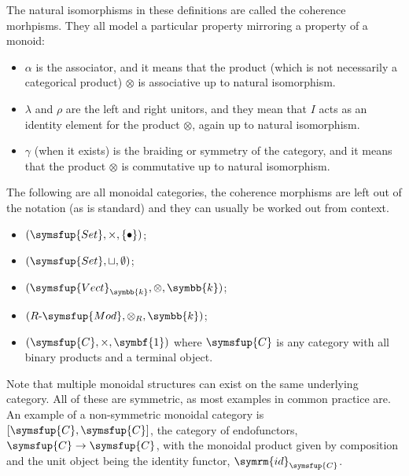 \documentclass[fleqn]{NotesClass}
\makeatletter
\newcommand{\cat}[1]{\symsfup{#1}}
\newcommand{\terminal}{\symbf{1}}
\newcommand{\c@egory}[1]{\symsfup{#1}}
\newcommand{\Set}{\c@egory{Set}}
\newcommand{\Vect}[1][\field]{\c@egory{Vect}_{#1}}
\newcommand{\RMod}[1][R]{#1\text{-}\c@egory{Mod}}
\newcommand{\id}{\symrm{id}}
\renewcommand{\field}{\symbb{k}}
\makeatother
\begin{document}
    The natural isomorphisms in these definitions are called the coherence morhpisms.
    They all model a particular property mirroring a property of a monoid:
    \begin{itemize}
        \item \(\alpha\) is the associator, and it means that the product (which is not necessarily a categorical product) \(\otimes\) is associative up to natural isomorphism.
        \item \(\lambda\) and \(\rho\) are the left and right unitors, and they mean that \(I\) acts as an identity element for the product \(\otimes\), again up to natural isomorphism.
        \item \(\gamma\) (when it exists) is the braiding or symmetry of the category, and it means that the product \(\otimes\) is commutative up to natural isomorphism.
    \end{itemize}
    
    \begin{exm}{}{}
        The following are all monoidal categories, the coherence morphisms are left out of the notation (as is standard) and they can usually be worked out from context.
        \begin{itemize}
            \item \((\Set, \times, \{\bullet\})\);
            \item \((\Set, \sqcup, \emptyset)\);
            \item \((\Vect, \otimes, \field)\);
            \item \((\RMod, \otimes_R, \field)\);
            \item \((\cat{C}, \times, \terminal)\) where \(\cat{C}\) is any category with all binary products and a terminal object.
        \end{itemize}
        Note that multiple monoidal structures can exist on the same underlying category.
        All of these are symmetric, as most examples in common practice are.
        An example of a non-symmetric monoidal category is \([\cat{C}, \cat{C}]\), the category of endofunctors, \(\cat{C} \to \cat{C}\), with the monoidal product given by composition and the unit object being the identity functor, \(\id_{\cat{C}}\).
    \end{exm}
    
    
    \backmatter
    \renewcommand{\glossaryname}{Acronyms}
    \printglossary[acronym]
    \printindex
\end{document}
